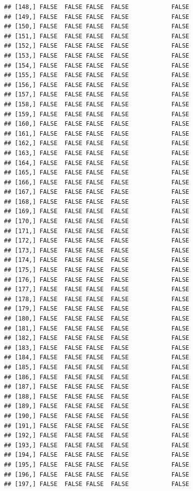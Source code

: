\documentclass[
  english,
  man,floatsintext]{apa6}
\begin{document}
\begin{verbatim}
## [148,] FALSE  FALSE FALSE  FALSE            FALSE
## [149,] FALSE  FALSE FALSE  FALSE            FALSE
## [150,] FALSE  FALSE FALSE  FALSE            FALSE
## [151,] FALSE  FALSE FALSE  FALSE            FALSE
## [152,] FALSE  FALSE FALSE  FALSE            FALSE
## [153,] FALSE  FALSE FALSE  FALSE            FALSE
## [154,] FALSE  FALSE FALSE  FALSE            FALSE
## [155,] FALSE  FALSE FALSE  FALSE            FALSE
## [156,] FALSE  FALSE FALSE  FALSE            FALSE
## [157,] FALSE  FALSE FALSE  FALSE            FALSE
## [158,] FALSE  FALSE FALSE  FALSE            FALSE
## [159,] FALSE  FALSE FALSE  FALSE            FALSE
## [160,] FALSE  FALSE FALSE  FALSE            FALSE
## [161,] FALSE  FALSE FALSE  FALSE            FALSE
## [162,] FALSE  FALSE FALSE  FALSE            FALSE
## [163,] FALSE  FALSE FALSE  FALSE            FALSE
## [164,] FALSE  FALSE FALSE  FALSE            FALSE
## [165,] FALSE  FALSE FALSE  FALSE            FALSE
## [166,] FALSE  FALSE FALSE  FALSE            FALSE
## [167,] FALSE  FALSE FALSE  FALSE            FALSE
## [168,] FALSE  FALSE FALSE  FALSE            FALSE
## [169,] FALSE  FALSE FALSE  FALSE            FALSE
## [170,] FALSE  FALSE FALSE  FALSE            FALSE
## [171,] FALSE  FALSE FALSE  FALSE            FALSE
## [172,] FALSE  FALSE FALSE  FALSE            FALSE
## [173,] FALSE  FALSE FALSE  FALSE            FALSE
## [174,] FALSE  FALSE FALSE  FALSE            FALSE
## [175,] FALSE  FALSE FALSE  FALSE            FALSE
## [176,] FALSE  FALSE FALSE  FALSE            FALSE
## [177,] FALSE  FALSE FALSE  FALSE            FALSE
## [178,] FALSE  FALSE FALSE  FALSE            FALSE
## [179,] FALSE  FALSE FALSE  FALSE            FALSE
## [180,] FALSE  FALSE FALSE  FALSE            FALSE
## [181,] FALSE  FALSE FALSE  FALSE            FALSE
## [182,] FALSE  FALSE FALSE  FALSE            FALSE
## [183,] FALSE  FALSE FALSE  FALSE            FALSE
## [184,] FALSE  FALSE FALSE  FALSE            FALSE
## [185,] FALSE  FALSE FALSE  FALSE            FALSE
## [186,] FALSE  FALSE FALSE  FALSE            FALSE
## [187,] FALSE  FALSE FALSE  FALSE            FALSE
## [188,] FALSE  FALSE FALSE  FALSE            FALSE
## [189,] FALSE  FALSE FALSE  FALSE            FALSE
## [190,] FALSE  FALSE FALSE  FALSE            FALSE
## [191,] FALSE  FALSE FALSE  FALSE            FALSE
## [192,] FALSE  FALSE FALSE  FALSE            FALSE
## [193,] FALSE  FALSE FALSE  FALSE            FALSE
## [194,] FALSE  FALSE FALSE  FALSE            FALSE
## [195,] FALSE  FALSE FALSE  FALSE            FALSE
## [196,] FALSE  FALSE FALSE  FALSE            FALSE
## [197,] FALSE  FALSE FALSE  FALSE            FALSE

\end{verbatim}
\end{document}
